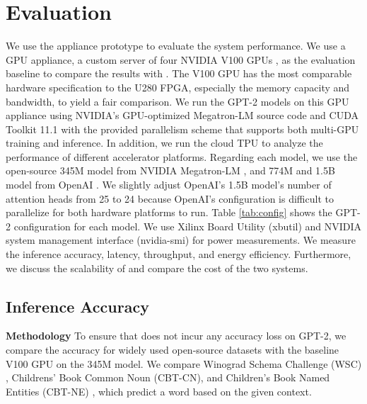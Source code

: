 \section{Evaluation}
\label{evaluation}

We use the \sysname{} appliance prototype to evaluate the system performance. We use a GPU appliance, a custom server of four NVIDIA V100 GPUs \cite{v100}, as the evaluation baseline to compare the results with \sysname{}.
The V100 GPU has the most comparable hardware specification to the U280 FPGA, especially the memory capacity and bandwidth, to yield a fair comparison. We run the GPT-2 models on this GPU appliance using NVIDIA's GPU-optimized Megatron-LM source code \cite{shoeybi2019megatron} and CUDA Toolkit 11.1 with the provided parallelism scheme that supports both multi-GPU training and inference. In addition, we run the cloud TPU \cite{jouppi2017datacenter, tpucloud} to analyze the performance of different accelerator platforms. Regarding each model, we use the open-source 345M model from NVIDIA Megatron-LM \cite{shoeybi2019megatron}, and 774M and 1.5B model from OpenAI \cite{radford2019language}. We slightly adjust OpenAI’s 1.5B model’s number of attention heads from 25 to 24 because OpenAI’s configuration is difficult to parallelize for both hardware platforms to run. Table \ref{tab:config} shows the GPT-2 configuration for each model. We use Xilinx Board Utility (xbutil)  and NVIDIA system management interface (nvidia-smi) for power measurements. We measure the inference accuracy, latency, throughput, and energy efficiency. Furthermore, we discuss the scalability of \sysname{} and compare the cost of the two systems.

\subsection{Inference Accuracy}

\textbf{Methodology}
To ensure that \sysname{} does not incur any accuracy loss on GPT-2, we compare the accuracy for widely used open-source datasets with the baseline V100 GPU on the 345M model. We compare Winograd Schema Challenge (WSC) \cite{levesque2012winograd}, Childrens' Book Common Noun (CBT-CN), and Children's Book Named Entities (CBT-NE) \cite{bajgar2016embracing}, which predict a word based on the given context.

